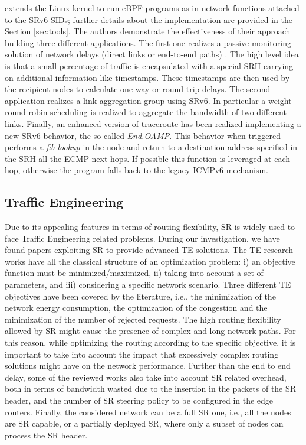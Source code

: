 \cite{xhonneux2018leveraging} extends the Linux kernel to run eBPF programs as in-network functions attached to the SRv6 SIDs; further details about the implementation are provided in the Section \ref{sec:tools}. The authors demonstrate the effectiveness of their approach building three different applications. The first one realizes a passive monitoring solution of network delays (direct links or end-to-end paths) \cite{id-udp-pm}. The high level idea is that a small percentage of traffic is encapsulated with a special SRH carrying on additional information like timestamps. These timestamps are then used by the recipient nodes to calculate one-way or round-trip delays. 
The second application realizes a link aggregation group using SRv6. In particular a weight-round-robin scheduling is realized to aggregate the bandwidth of two different links. Finally, an enhanced version of traceroute has been realized implementing a new SRv6 behavior, the so called \textit{End.OAMP}. This behavior when triggered performs a \textit{fib lookup} in the node and return to a destination address specified in the SRH all the ECMP next hops. If possible this function is leveraged at each hop, otherwise the program falls back to the legacy ICMPv6 mechanism.

\subsection{Traffic Engineering}
\label{sec:te}
Due to its appealing features in terms of routing flexibility, SR is widely used to face Traffic Engineering related problems.
During our investigation, we have found \tePapers papers exploiting SR to provide advanced TE solutions.
The TE research works have all the classical structure of an optimization problem: i) an objective function must be minimized/maximized, ii) taking into account a set of parameters, and iii) considering a specific network scenario.
Three different TE objectives have been covered by the literature, i.e., the minimization of the network energy consumption, the optimization of the congestion and the minimization of the number of rejected requests.
The high routing flexibility allowed by SR might cause the presence of complex and long network paths.
For this reason, while optimizing the routing according to the specific objective, it is important to take into account the impact that excessively complex routing solutions might have on the network performance.
Further than the end to end delay, some of the reviewed works also take into account SR related overhead, both in terms of bandwidth wasted due to the insertion in the packets of the SR header, and the number of SR steering policy to be configured in the edge routers.
Finally, the considered network can be a full SR one, i.e., all the nodes are SR capable, or a partially deployed SR, where only a subset of nodes can process the SR header.

